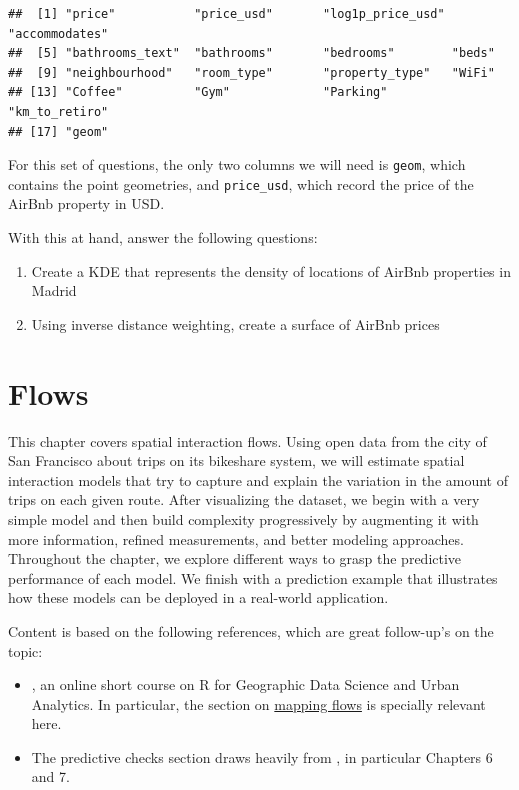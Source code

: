 \documentclass[
]{book}
\providecommand{\tightlist}{%
  \setlength{\itemsep}{0pt}\setlength{\parskip}{0pt}}
\begin{document}
\begin{verbatim}
##  [1] "price"           "price_usd"       "log1p_price_usd" "accommodates"   
##  [5] "bathrooms_text"  "bathrooms"       "bedrooms"        "beds"           
##  [9] "neighbourhood"   "room_type"       "property_type"   "WiFi"           
## [13] "Coffee"          "Gym"             "Parking"         "km_to_retiro"   
## [17] "geom"
\end{verbatim}

For this set of questions, the only two columns we will need is \texttt{geom}, which contains the point geometries, and \texttt{price\_usd}, which record the price of the AirBnb property in USD.

With this at hand, answer the following questions:

\begin{enumerate}
\def\labelenumi{\arabic{enumi}.}
\tightlist
\item
  Create a KDE that represents the density of locations of AirBnb properties in Madrid
\item
  Using inverse distance weighting, create a surface of AirBnb prices
\end{enumerate}

\hypertarget{flows}{%
\chapter{Flows}\label{flows}}

This chapter covers spatial interaction flows. Using open data from the city of San Francisco about trips on its bikeshare system, we will estimate spatial interaction models that try to capture and explain the variation in the amount of trips on each given route. After visualizing the dataset, we begin with a very simple model and then build complexity progressively by augmenting it with more information, refined measurements, and better modeling approaches. Throughout the chapter, we explore different ways to grasp the predictive performance of each model. We finish with a prediction example that illustrates how these models can be deployed in a real-world application.

Content is based on the following references, which are great follow-up's on the topic:

\begin{itemize}
\tightlist
\item
  \citet{gds_ua17}, an online short course on R for Geographic Data Science and Urban Analytics. In particular, the section on \href{https://github.com/alexsingleton/GDS_UA_2017/tree/master/Mapping_Flows}{mapping flows} is specially relevant here.
\item
  The predictive checks section draws heavily from \citet{gelman2006data}, in particular Chapters 6 and 7.
\end{itemize}
\end{document}
